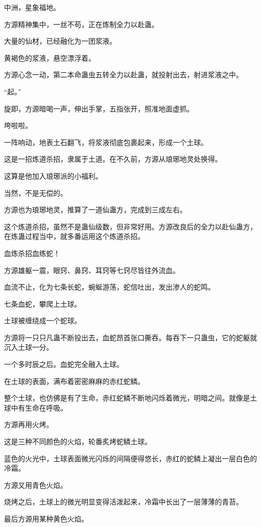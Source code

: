 
\begin{this_body}

中洲，星象福地。

方源精神集中，一丝不苟，正在炼制全力以赴蛊。

大量的仙材，已经融化为一团浆液。

黄褐色的浆液，悬空漂浮着。

方源心念一动，第二本命蛊虫五转全力以赴蛊，就投射出去，射进浆液之中。

“起。”

旋即，方源暗喝一声，伸出手掌，五指张开，照准地面虚抓。

垮啦啦。

一阵响动，地表土石翻飞，将浆液彻底包裹起来，形成一个土球。

这是一招炼道杀招，隶属于土道。在不久前，方源从琅琊地灵处换得。

这算是他加入琅琊派的小福利。

当然，不是无偿的。

方源也为琅琊地灵，推算了一道仙蛊方，完成到三成左右。

这个炼道杀招，虽然不是蛊仙级数，但非常好用。方源改良后的全力以赴仙蛊方，在炼蛊过程当中，就多番运用这个炼道杀招。

血炼杀招血练蛇！

方源雄躯一震，眼窍、鼻窍、耳窍等七窍尽皆往外流血。

血流不止，化为七条长蛇，蜿蜒游荡，蛇信吐出，发出渗人的蛇鸣。

七条血蛇，攀爬上土球。

土球被缠绕成一个蛇球。

方源将一只只凡蛊不断投出去，血蛇昂首张口撕吞。每吞下一只蛊虫，它的蛇躯就沉入土球一分。

一个多时辰之后。血蛇完全融入土球。

在土球的表面，满布着密密麻麻的赤红蛇鳞。

整个土球，也仿佛是有了生命，赤红蛇鳞不断地闪烁着微光，明暗之间。就像是土球中有生命在呼吸。

方源再用火烤。

这是三种不同颜色的火焰，轮番炙烤蛇鳞土球。

蓝色的火光中，土球表面微光闪烁的间隔便得悠长，赤红的蛇鳞上凝出一层白色的冷霜。

方源又用青色火焰。

烧烤之后，土球上的微光明显变得活泼起来，冷霜中长出了一层薄薄的青苔。

最后方源用某种黄色火焰。


\end{this_body}
